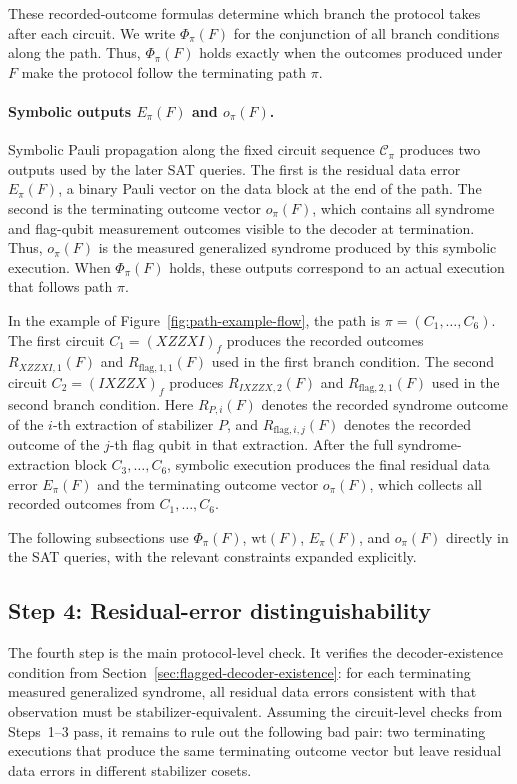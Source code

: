 \documentclass[acmsmall,screen,review,anonymous,nonacm]{acmart}
\begin{document}
These recorded-outcome formulas determine which branch the protocol takes after each circuit. We write $\Phi_\pi(F)$ for the conjunction of all branch conditions along the path. Thus, $\Phi_\pi(F)$ holds exactly when the outcomes produced under $F$ make the protocol follow the terminating path $\pi$.

\paragraph{Symbolic outputs $E_\pi(F)$ and $o_\pi(F)$.}
Symbolic Pauli propagation along the fixed circuit sequence $\mathcal{C}_\pi$ produces two outputs used by the later SAT queries. The first is the residual data error $E_\pi(F)$, a binary Pauli vector on the data block at the end of the path. The second is the terminating outcome vector $o_\pi(F)$, which contains all syndrome and flag-qubit measurement outcomes visible to the decoder at termination. Thus, $o_\pi(F)$ is the measured generalized syndrome produced by this symbolic execution. When $\Phi_\pi(F)$ holds, these outputs correspond to an actual execution that follows path $\pi$.

In the example of Figure~\ref{fig:path-example-flow}, the path is $\pi=(C_1,\ldots,C_6)$. The first circuit $C_1=(XZZXI)_f$ produces the recorded outcomes $R_{XZZXI,1}(F)$ and $R_{\mathrm{flag},1,1}(F)$ used in the first branch condition. The second circuit $C_2=(IXZZX)_f$ produces $R_{IXZZX,2}(F)$ and $R_{\mathrm{flag},2,1}(F)$ used in the second branch condition. Here $R_{P,i}(F)$ denotes the recorded syndrome outcome of the $i$-th extraction of stabilizer $P$, and $R_{\mathrm{flag},i,j}(F)$ denotes the recorded outcome of the $j$-th flag qubit in that extraction. After the full syndrome-extraction block $C_3,\ldots,C_6$, symbolic execution produces the final residual data error $E_\pi(F)$ and the terminating outcome vector $o_\pi(F)$, which collects all recorded outcomes from $C_1,\ldots,C_6$.

The following subsections use $\Phi_\pi(F)$, $\mathrm{wt}(F)$, $E_\pi(F)$, and $o_\pi(F)$ directly in the SAT queries, with the relevant constraints expanded explicitly.


\subsection{Step 4: Residual-error distinguishability}
\label{subsec:residual-error-distinguishability}

The fourth step is the main protocol-level check. It verifies the decoder-existence condition from Section~\ref{sec:flagged-decoder-existence}: for each terminating measured generalized syndrome, all residual data errors consistent with that observation must be stabilizer-equivalent. Assuming the circuit-level checks from Steps~1--3 pass, it remains to rule out the following bad pair: two terminating executions that produce the same terminating outcome vector but leave residual data errors in different stabilizer cosets.
\end{document}
